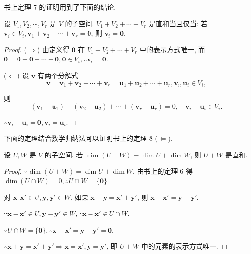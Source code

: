 \documentclass{ctexart}
\begin{document}
书上定理 7 的证明用到了下面的结论.
\begin{theorem}
    设 $V_1,V_2,\cdots,V_r$ 是 $V$ 的子空间. $V_1+V_2+\cdots+V_r$ 是直和当且仅当: 若 $\boldsymbol{v}_i\in V_i,\boldsymbol{v}_1+\boldsymbol{v}_2+\cdots+\boldsymbol{v}_r=\boldsymbol{0}$, 则 $\boldsymbol{v}_i=\boldsymbol{0}$.
\end{theorem}
\begin{proof}
    ($\Rightarrow$) 由定义得 $\boldsymbol{0}$ 在 $V_1+V_2+\cdots+V_r$ 中的表示方式唯一, 而 $\boldsymbol{0}=\boldsymbol{0}+\boldsymbol{0}+\cdots+\boldsymbol{0},\boldsymbol{0}\in V_i,\therefore\boldsymbol{v}_i=\boldsymbol{0}$.

    ($\Leftarrow$) 设 $\boldsymbol{v}$ 有两个分解式
    \[\boldsymbol{v}=\boldsymbol{v}_1+\boldsymbol{v}_2+\cdots+\boldsymbol{v}_r=\boldsymbol{u}_1+\boldsymbol{u}_2+\cdots+\boldsymbol{u}_r,\boldsymbol{v}_i,\boldsymbol{u}_i\in V_i,\]

    则
    \[(\boldsymbol{v}_1-\boldsymbol{u}_1)+(\boldsymbol{v}_2-\boldsymbol{u}_2)+\cdots+(\boldsymbol{v}_r-\boldsymbol{u}_r)=0,\quad\boldsymbol{v}_i-\boldsymbol{u}_i\in V_i.\]

    $\therefore\boldsymbol{v}_i-\boldsymbol{u}_i=\boldsymbol{0},\boldsymbol{v}_i=\boldsymbol{u}_i$.
\end{proof}
下面的定理结合数学归纳法可以证明书上的定理 8 ($\Leftarrow$).
\begin{theorem}\label{t1.4}
    设 $U,W$ 是 $V$ 的子空间. 若 $\dim(U+W)=\dim U+\dim W$, 则 $U+W$ 是直和.
\end{theorem}
\begin{proof}
    $\because\dim(U+W)=\dim U+\dim W$, 由书上的定理 6 得 $\dim(U\cap W)=0,\therefore U\cap W=\{\boldsymbol{0}\}$.

    对 $\boldsymbol{x},\boldsymbol{x}'\in U,\boldsymbol{y},\boldsymbol{y}'\in W$, 如果 $\boldsymbol{x}+\boldsymbol{y}=\boldsymbol{x}'+\boldsymbol{y}'$, 则 $\boldsymbol{x}-\boldsymbol{x}'=\boldsymbol{y}-\boldsymbol{y}'$.

    $\because\boldsymbol{x}-\boldsymbol{x}'\in U,\boldsymbol{y}-\boldsymbol{y}'\in W,\therefore\boldsymbol{x}-\boldsymbol{x}'\in U\cap W$.

    $\because U\cap W=\{\boldsymbol{0}\},\therefore\boldsymbol{x}-\boldsymbol{x}'=\boldsymbol{y}-\boldsymbol{y}'=\boldsymbol{0}$.

    $\therefore\boldsymbol{x}+\boldsymbol{y}=\boldsymbol{x}'+\boldsymbol{y}'\Rightarrow\boldsymbol{x}=\boldsymbol{x}',\boldsymbol{y}=\boldsymbol{y}'$, 即 $U+W$ 中的元素的表示方式唯一.
\end{proof}
\end{document}
